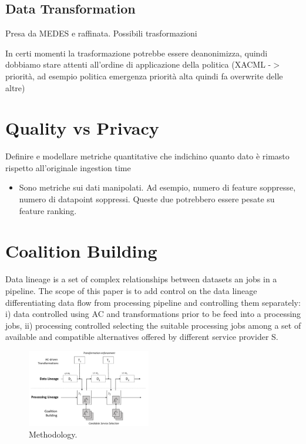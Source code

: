 \documentclass[10pt,journal,compsoc]{IEEEtran}
\begin{document}
\subsection{Data Transformation}
Presa da MEDES e raffinata. Possibili trasformazioni

In certi momenti la trasformazione potrebbe essere deanonimizza, quindi dobbiamo stare attenti all’ordine di applicazione della politica (XACML -$>$ priorità, ad esempio politica emergenza priorità alta quindi fa overwrite delle altre)

\section{Quality vs Privacy}
Definire e modellare metriche quantitative che indichino quanto dato è rimasto rispetto all’originale ingestion time
\begin{itemize}
    \item Sono metriche sui dati manipolati. Ad esempio, numero di feature soppresse, numero di datapoint soppressi. Queste due potrebbero essere pesate su feature ranking.
\end{itemize}

\section{Coalition Building}
Data lineage is a set of complex relationships between datasets an jobs in a pipeline. 
The scope of this paper is to add control on the data lineage differentiating data flow from processing pipeline and controlling them separately: i) data controlled using AC and transformations prior to be feed into a processing jobs, ii) processing controlled selecting the suitable processing jobs among a set of available and compatible alternatives offered by different service provider S.

\begin{figure}[!t]
	\centering
	\includegraphics[width=0.48\textwidth]{meth.pdf}
\caption{Methodology.}
	\label{fig:smet}
\end{figure} 
\end{document}
